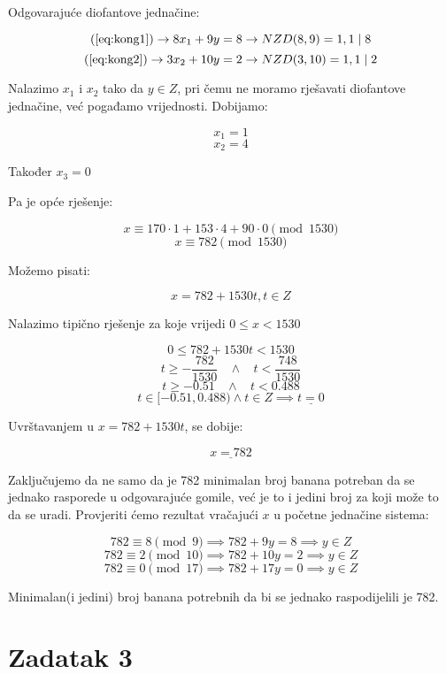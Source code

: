 \documentclass[12pt]{article}
\begin{document}
Odgovarajuće diofantove jednačine:

$$(\ref{eq:kong1}) \to 8x_{1} + 9y = 8 \to NZD(8, 9) = 1, 1 \mid 8$$
$$(\ref{eq:kong2}) \to 3x_{2} + 10y = 2 \to NZD(3, 10) = 1, 1 \mid 2$$\vspace{1mm}

Nalazimo $x_{1}$ i $x_{2}$ tako da $y \in Z$, pri čemu ne moramo rješavati diofantove jednačine, već pogađamo vrijednosti. Dobijamo:

$$x_{1} = 1$$
$$x_{2} = 4$$
\begin{center}
Također $x_{3} = 0$
\end{center}

Pa je opće rješenje:

$$x \equiv 170 \cdot 1 + 153 \cdot 4 + 90 \cdot 0 \pmod{1530}$$
$$x \equiv 782 \pmod{1530}$$

Možemo pisati:

$$x = 782 + 1530t, t\in Z$$\vspace{1mm}

Nalazimo tipično rješenje za koje vrijedi $0 \leq x < 1530$

$$0 \leq 782 + 1530t < 1530$$\vspace{1mm}
$$t \geq - \frac{782}{1530} \>\>\>\> \land \>\>\>\> t < \frac{748}{1530}$$\vspace{1mm}
$$t \geq - 0.51 \>\>\>\> \land \>\>\>\> t < 0.488$$\vspace{1mm}
$$t\in [-0.51, 0.488) \land t \in Z \implies \underline{t = 0}$$\vspace{1mm}

Uvrštavanjem u $x = 782 + 1530t$, se dobije:

$$\underline{x = 782}$$\vspace{1mm}

Zaključujemo da ne samo da je 782 minimalan broj banana potreban da se jednako rasporede u odgovarajuće gomile, već je to i jedini broj za koji može to da se uradi. Provjeriti ćemo rezultat vračajući $x$ u početne jednačine sistema:

$$782 \equiv 8 \pmod{9} \implies 782 + 9y = 8 \implies y \in Z$$
$$782 \equiv 2 \pmod{10} \implies 782 + 10y = 2 \implies y \in Z$$
$$782 \equiv 0 \pmod{17} \implies 782 + 17y = 0 \implies y \in Z$$\vspace{1mm}

Minimalan(i jedini) broj banana potrebnih da bi se jednako raspodijelili je 782.

\newpage

\section*{Zadatak 3\label{Z3}}
\end{document}
